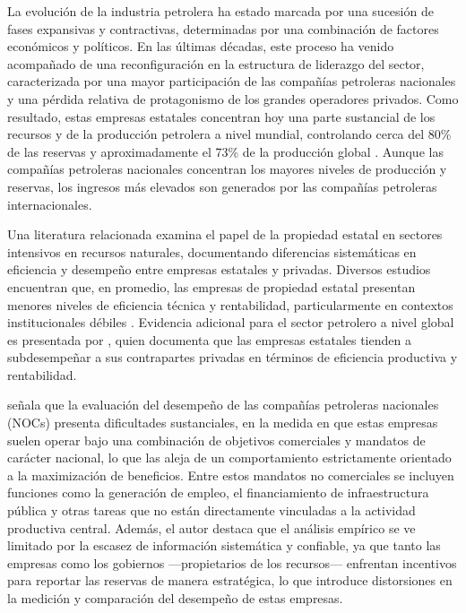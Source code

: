 \documentclass[../../PTFM.tex]{subfiles}
\begin{document}
	La evolución de la industria petrolera ha estado marcada por una sucesión de fases expansivas y contractivas, determinadas por una combinación de factores económicos y políticos. En las últimas décadas, este proceso ha venido acompañado de una reconfiguración en la estructura de liderazgo del sector, caracterizada por una mayor participación de las compañías petroleras nacionales y una pérdida relativa de protagonismo de los grandes operadores privados. Como resultado, estas empresas estatales concentran hoy una parte sustancial de los recursos y de la producción petrolera a nivel mundial, controlando cerca del 80\% de las reservas y aproximadamente el 73\% de la producción global \parencite{Makarova2007}. Aunque las compañías petroleras nacionales concentran los mayores niveles de producción y reservas, los ingresos más elevados son generados por las compañías petroleras internacionales.
	
	Una literatura relacionada examina el papel de la propiedad estatal en sectores intensivos en recursos naturales, documentando diferencias sistemáticas en eficiencia y desempeño entre empresas estatales y privadas. Diversos estudios encuentran que, en promedio, las empresas de propiedad estatal presentan menores niveles de eficiencia técnica y rentabilidad, particularmente en contextos institucionales débiles \parencite{Vining1992,Dewenter2001,Makarova2007}. Evidencia adicional para el sector petrolero a nivel global es presentada por \textcite{Wolf2009}, quien documenta que las empresas estatales tienden a subdesempeñar a sus contrapartes privadas en términos de eficiencia productiva y rentabilidad.
	
	\textcite{Makarova2007} señala que la evaluación del desempeño de las compañías petroleras nacionales (NOCs) presenta dificultades sustanciales, en la medida en que estas empresas suelen operar bajo una combinación de objetivos comerciales y mandatos de carácter nacional, lo que las aleja de un comportamiento estrictamente orientado a la maximización de beneficios. Entre estos mandatos no comerciales se incluyen funciones como la generación de empleo, el financiamiento de infraestructura pública y otras tareas que no están directamente vinculadas a la actividad productiva central. Además, el autor destaca que el análisis empírico se ve limitado por la escasez de información sistemática y confiable, ya que tanto las empresas como los gobiernos —propietarios de los recursos— enfrentan incentivos para reportar las reservas de manera estratégica, lo que introduce distorsiones en la medición y comparación del desempeño de estas empresas.
	
\end{document}
